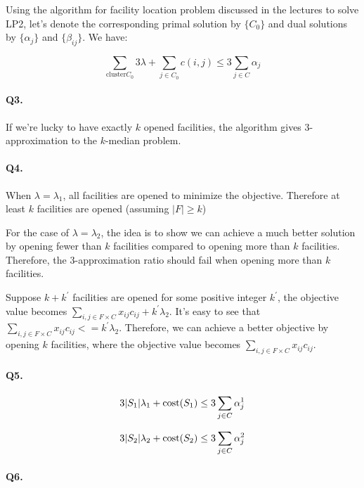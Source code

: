 \documentclass{article}
\begin{document}
Using the algorithm for facility location problem discussed in the lectures to solve LP2, let's denote the corresponding primal solution by $\{C_0\}$ and dual solutions by $\{\alpha_j\}$ and $\{\beta_{ij}\}$.
We have:

\[
  \sum_{\text{cluster} C_0} 3\lambda + \sum_{j \in C_0} c(i, j) \le 3 \sum_{j \in C} \alpha_j
\]


\paragraph{Q3. }

If we're lucky to have exactly $k$ opened facilities, the algorithm gives 3-approximation to the $k$-median problem. 

\paragraph{Q4. }

When $\lambda=\lambda_1$, all facilities are opened to minimize the objective.
Therefore at least $k$ facilities are opened (assuming $|F|\ge k$)

For the case of $\lambda=\lambda_2$, the idea is to show we can achieve a much better solution by opening fewer than $k$ facilities compared to opening more than $k$ facilities. Therefore, the $3$-approximation ratio should fail when opening more than $k$ facilities. 

Suppose $k+k^{'}$ facilities are opened for some positive integer $k^{'}$, the objective value becomes $\sum_{i, j \in F\times C} x_{ij} c_{ij} + k^{'} \lambda_2$.
It's easy to see that $\sum_{i, j \in F\times C} x_{ij} c_{ij} <= k^{'} \lambda_2$.
Therefore, we can achieve a better objective by opening $k$ facilities, where the objective value becomes $\sum_{i, j \in F\times C} x_{ij} c_{ij}$.


\paragraph{Q5. }

\[
  3 |S_1|\lambda_1 + \text{cost}(S_1)  \le 3\sum_{j \in C} \alpha^1_j
\]

\[
  3 |S_2|\lambda_2 + \text{cost}(S_2)  \le 3\sum_{j \in C} \alpha^2_j
\]  

\paragraph{Q6. }
\end{document}
